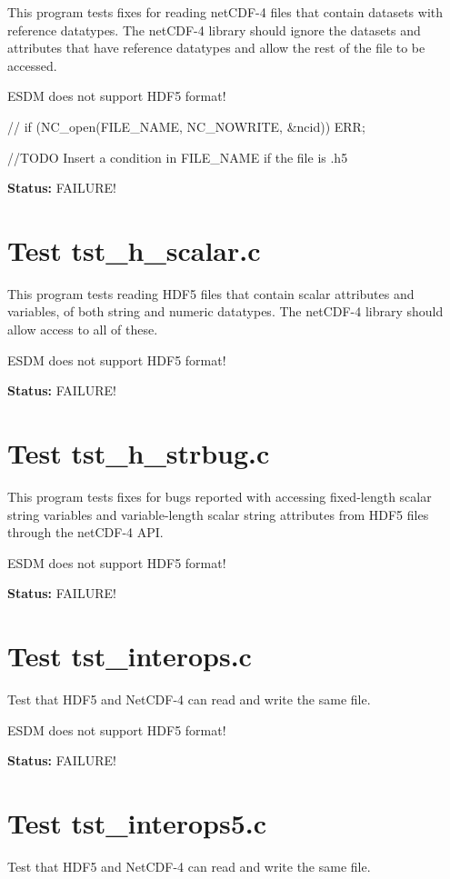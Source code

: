 This program tests fixes for reading netCDF-4 files that contain datasets with reference datatypes.  The netCDF-4 library should ignore the datasets and attributes that have reference datatypes and allow the rest of the file to be accessed.

ESDM does not support HDF5 format!

// if (NC\_open(FILE\_NAME, NC\_NOWRITE, \&ncid)) ERR;

//TODO Insert a condition in FILE\_NAME if the file is .h5

{\bf \large Status: } FAILURE!

\section{Test tst\_h\_scalar.c}

This program tests reading HDF5 files that contain scalar attributes and variables, of both string and numeric datatypes.  The netCDF-4 library should allow access to all of these.

ESDM does not support HDF5 format!

{\bf \large Status: } FAILURE!

\section{Test tst\_h\_strbug.c}

This program tests fixes for bugs reported with accessing fixed-length scalar string variables and variable-length scalar string attributes from HDF5 files through the netCDF-4 API.

ESDM does not support HDF5 format!

{\bf \large Status: } FAILURE!

\section{Test tst\_interops.c}

Test that HDF5 and NetCDF-4 can read and write the same file.

ESDM does not support HDF5 format!

{\bf \large Status: } FAILURE!

\section{Test tst\_interops5.c}

Test that HDF5 and NetCDF-4 can read and write the same file.


